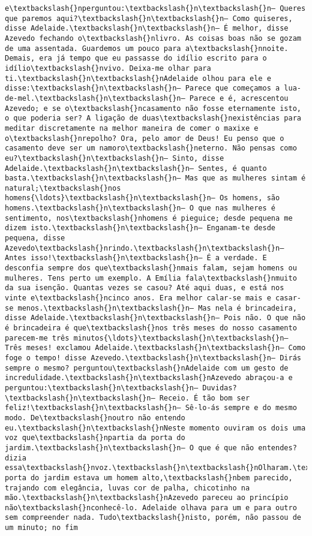 \documentclass[11pt]{article}
\begin{document}
\begin{Verbatim}[commandchars=\\\{\}]
e\textbackslash{}nperguntou:\textbackslash{}n\textbackslash{}n— Queres que paremos aqui?\textbackslash{}n\textbackslash{}n— Como quiseres, disse Adelaide.\textbackslash{}n\textbackslash{}n— É melhor, disse Azevedo fechando o\textbackslash{}nlivro. As coisas boas não se gozam de uma assentada. Guardemos um pouco para a\textbackslash{}nnoite. Demais, era já tempo que eu passasse do idílio escrito para o idílio\textbackslash{}nvivo. Deixa-me olhar para ti.\textbackslash{}n\textbackslash{}nAdelaide olhou para ele e disse:\textbackslash{}n\textbackslash{}n— Parece que começamos a lua-de-mel.\textbackslash{}n\textbackslash{}n— Parece e é, acrescentou Azevedo; e se o\textbackslash{}ncasamento não fosse eternamente isto, o que poderia ser? A ligação de duas\textbackslash{}nexistências para meditar discretamente na melhor maneira de comer o maxixe e o\textbackslash{}nrepolho? Ora, pelo amor de Deus! Eu penso que o casamento deve ser um namoro\textbackslash{}neterno. Não pensas como eu?\textbackslash{}n\textbackslash{}n— Sinto, disse Adelaide.\textbackslash{}n\textbackslash{}n— Sentes, é quanto basta.\textbackslash{}n\textbackslash{}n— Mas que as mulheres sintam é natural;\textbackslash{}nos homens{\ldots}\textbackslash{}n\textbackslash{}n— Os homens, são homens.\textbackslash{}n\textbackslash{}n— O que nas mulheres é sentimento, nos\textbackslash{}nhomens é pieguice; desde pequena me dizem isto.\textbackslash{}n\textbackslash{}n— Enganam-te desde pequena, disse Azevedo\textbackslash{}nrindo.\textbackslash{}n\textbackslash{}n— Antes isso!\textbackslash{}n\textbackslash{}n— É a verdade. E desconfia sempre dos que\textbackslash{}nmais falam, sejam homens ou mulheres. Tens perto um exemplo. A Emília fala\textbackslash{}nmuito da sua isenção. Quantas vezes se casou? Até aqui duas, e está nos vinte e\textbackslash{}ncinco anos. Era melhor calar-se mais e casar-se menos.\textbackslash{}n\textbackslash{}n— Mas nela é brincadeira, disse Adelaide.\textbackslash{}n\textbackslash{}n— Pois não. O que não é brincadeira é que\textbackslash{}nos três meses do nosso casamento parecem-me três minutos{\ldots}\textbackslash{}n\textbackslash{}n— Três meses! exclamou Adelaide.\textbackslash{}n\textbackslash{}n— Como foge o tempo! disse Azevedo.\textbackslash{}n\textbackslash{}n— Dirás sempre o mesmo? perguntou\textbackslash{}nAdelaide com um gesto de incredulidade.\textbackslash{}n\textbackslash{}nAzevedo abraçou-a e perguntou:\textbackslash{}n\textbackslash{}n— Duvidas?\textbackslash{}n\textbackslash{}n— Receio. É tão bom ser feliz!\textbackslash{}n\textbackslash{}n— Sê-lo-ás sempre e do mesmo modo. De\textbackslash{}noutro não entendo eu.\textbackslash{}n\textbackslash{}nNeste momento ouviram os dois uma voz que\textbackslash{}npartia da porta do jardim.\textbackslash{}n\textbackslash{}n— O que é que não entendes? dizia essa\textbackslash{}nvoz.\textbackslash{}n\textbackslash{}nOlharam.\textbackslash{}n\textbackslash{}nÀ porta do jardim estava um homem alto,\textbackslash{}nbem parecido, trajando com elegância, luvas cor de palha, chicotinho na mão.\textbackslash{}n\textbackslash{}nAzevedo pareceu ao princípio não\textbackslash{}nconhecê-lo. Adelaide olhava para um e para outro sem compreender nada. Tudo\textbackslash{}nisto, porém, não passou de um minuto; no fim 
\end{Verbatim}
\end{document}
